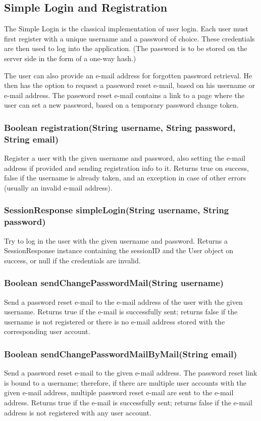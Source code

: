 \subsection{Simple Login and Registration}
\label{subsec:simple_login}

The Simple Login is the classical implementation of user login. Each user must first register with a unique username and a password of choice. These credentials are then used to log into the application. (The password is to be stored on the server side in the form of a one-way hash.)

The user can also provide an e-mail address for forgotten password retrieval. He then has the option to request a password reset e-mail, based on his username or e-mail address. The password reset e-mail contains a link to a page where the user can set a new password, based on a temporary password change token.

\subsubsection{Boolean registration(String username, String password, String email)}
Register a user with the given username and password, also setting the e-mail address if provided and sending registration info to it.
Returns true on success, false if the username is already taken, and an exception in case of other errors (usually an invalid e-mail address).

\subsubsection{SessionResponse simpleLogin(String username, String password)}
Try to log in the user with the given username and password.
Returns a SessionResponse instance containing the sessionID and the User object on success, or null if the credentials are invalid.

\subsubsection{Boolean sendChangePasswordMail(String username)}
Send a password reset e-mail
to the e-mail address of the user with the given username.
Returns true if the e-mail is successfully sent;
returns false if the username is not registered or there is no e-mail address stored with the corresponding user account.

\subsubsection{Boolean sendChangePasswordMailByMail(String email)}
Send a password reset e-mail to the given e-mail address.
The password reset link is bound to a username;
therefore, if there are multiple user accounts with the given e-mail address,
multiple password reset e-mail are sent to the e-mail address.
Returns true if the e-mail is successfully sent;
returns false if the e-mail address is not registered with any user account.

